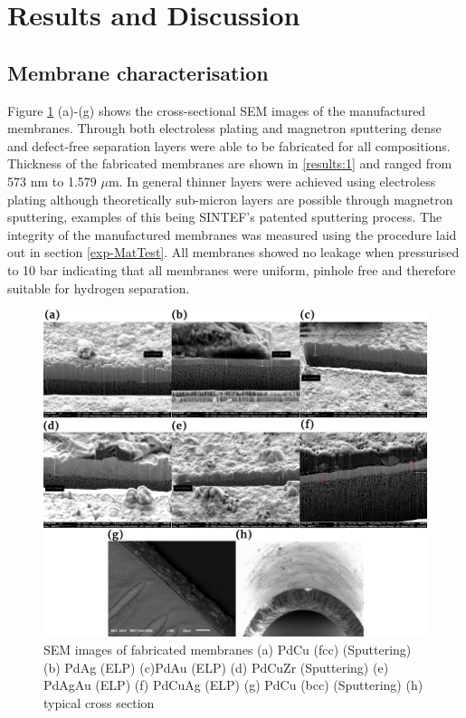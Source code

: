 \section{Results and Discussion}
\subsection{Membrane characterisation}


Figure \ref{fig:1} (a)-(g) shows the cross-sectional SEM images of the manufactured membranes. Through both electroless plating and magnetron sputtering dense and defect-free separation layers were able to be fabricated for all compositions. Thickness of the fabricated membranes are shown in \ref{results:1} and ranged from 573 nm to 1.579 $\mu$m. In general thinner layers were achieved using electroless plating although theoretically sub-micron layers are possible through magnetron sputtering, examples of this being SINTEF’s patented sputtering process.\cite{Peters2011} The integrity of the manufactured membranes was measured using the procedure laid out in section \ref{exp-MatTest}. All membranes showed no leakage when pressurised to 10 bar indicating that all membranes were uniform, pinhole free and therefore suitable for hydrogen separation. \cite{GouveiaGil2015}

\begin{figure}
    \centering
    \includegraphics[width=\linewidth, height=0.9\textheight,keepaspectratio]{figures/Semxsect.png}
    \caption{SEM images of fabricated membranes (a) PdCu (fcc) (Sputtering) (b) PdAg (ELP) (c)PdAu (ELP) (d) PdCuZr (Sputtering) (e) PdAgAu (ELP) (f) PdCuAg (ELP) (g) PdCu (bcc) (Sputtering) (h) typical cross section}
    \label{fig:1}
\end{figure}

